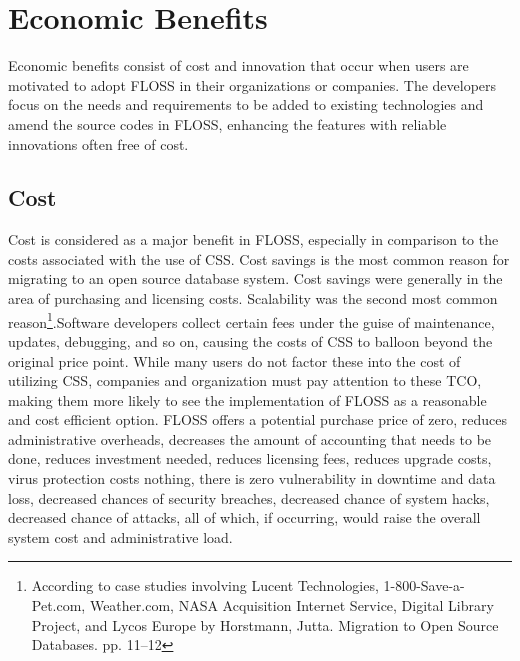   \section{Economic Benefits}
  Economic benefits consist of cost and innovation that occur when users are motivated to adopt FLOSS in their organizations or companies. The developers focus on the needs and requirements to be added to existing technologies and amend the source codes in FLOSS, enhancing the features with reliable innovations often free of cost. 
  
  \subsection {Cost}

  
  Cost is considered as a major benefit in FLOSS, especially in comparison to the costs associated with the use of CSS.  Cost savings is the most common reason for migrating to an open source database system. Cost savings were generally in the area of purchasing and licensing costs. Scalability was the second most common reason\footnote{According to case studies involving Lucent Technologies, 1-800-Save-a-Pet.com, Weather.com, NASA Acquisition Internet Service, Digital Library Project, and Lycos Europe by Horstmann, Jutta. Migration to Open Source Databases. pp. 11--12 }.Software developers collect certain fees under the guise of maintenance, updates, debugging, and so on, causing the costs of CSS to balloon beyond the original price point. While many users do not factor these into the cost of utilizing CSS, companies and organization must pay attention to these \ac{TCO}, making them more likely to see the implementation of FLOSS as a reasonable and cost efficient option. FLOSS offers a potential purchase price of zero, reduces administrative overheads, decreases the amount of accounting that needs to be done, reduces investment needed, reduces licensing fees, reduces upgrade costs, virus protection costs nothing, there is zero vulnerability in downtime and data loss, decreased chances of security breaches, decreased chance of system hacks, decreased chance of attacks, all of which, if occurring, would raise the overall system cost and administrative load. 
  
